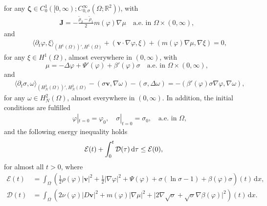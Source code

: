 \documentclass[11pt,reqno]{amsart}
\def\d{{\rm d}}
\def\l{\langle}
\def\r{\rangle}
\def\J{\mathbf{J}}
\begin{document}
%
for any $\bm{\zeta} \in C_0^1([0,\infty);C_{0,\sigma}^\infty(\Omega;\mathbb{R}^2))$, with
\begin{align}
\J= -\frac{\widetilde{\rho}_2-\widetilde{\rho}_1}{2} m(\varphi) \nabla \mu \quad \text{a.e. in } \Omega \times (0,\infty),
\label{J-weak}
\end{align}
and
\begin{align}
\label{phi-weak}
&\langle \partial_t \varphi,\xi \rangle_{(H^1(\Omega))',H^1(\Omega)}
+ ({\bm{v} \cdot \nabla \varphi},\xi)+ (m(\varphi)\nabla \mu,\nabla \xi)
=0,
\end{align}
for any  $\xi \in H^1(\Omega)$, almost everywhere in  $(0,\infty)$,
with
\begin{equation}
\label{mu-def}
\mu= -\Delta \varphi + \Psi'(\varphi) + \beta'(\varphi) \sigma \quad \text{a.e. in } \Omega \times (0,\infty),
\end{equation}
and
%
\begin{align}
&
\l\partial_t \sigma,\omega\r_{(H^2_N(\Omega))',H^2_N(\Omega)}
-(\sigma\bm{v},\nabla \omega)
-(\sigma, \Delta \omega)
=-(\beta'(\varphi)\sigma\nabla \varphi,\nabla \omega),
  \label{sig-weak1}
\end{align}
for any  $ \omega \in H^2_N(\Omega)$, almost everywhere in  $(0,\infty)$. In addition, the initial conditions are fulfilled
\begin{align}
& \varphi|_{t=0}=\varphi_{0},\quad \sigma|_{t=0}=\sigma_{0},\quad\textrm{a.e. in  } \Omega,	
\label{ini-w1}
\end{align}
%
and the following energy inequality holds
%
\begin{align}
&  \mathcal{E}(t)
+ \int_0^t \mathcal{D}(\tau)\,\d \tau\leq  \mathcal{E}(0),
\label{menergy-weak-fi}
\end{align}
%
for almost all $t>0$, where
%
\begin{align}
\mathcal{E}(t)
&=\int_{\Omega}\left( \frac{1}{2}\rho(\varphi)|\boldsymbol{v}|^{2}
+\frac{1}{2}|\nabla \varphi|^{2}
+ \Psi(\varphi) +\sigma(\ln \sigma-1)
+ \beta(\varphi) \sigma\right)(t) \, \mathrm{d} x,
\label{total-Energy}
\\
\mathcal{D}(t)
& =\int_{\Omega} \left(2 \nu(\varphi)|D \boldsymbol{v}|^{2}
+m(\varphi)|\nabla \mu|^{2} + \big| 2\nabla \sqrt{\sigma} + \sqrt{\sigma} \nabla \beta(\varphi) \big|^2  \right)(t)\, \mathrm{d} x.
\label{Total-Diss-1}
\end{align}
\end{document}
